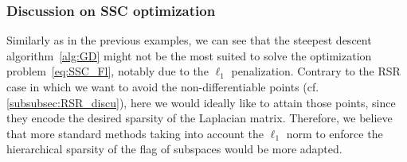 \subsubsection{Discussion on SSC optimization}\label{subsubsec:SSC_discu}
Similarly as in the previous examples, we can see that the steepest descent algorithm~\ref{alg:GD} might not be the most suited to solve the optimization problem~\eqref{eq:SSC_Fl}, notably due to the $\ell_1$ penalization. Contrary to the RSR case in which we want to avoid the non-differentiable points (cf. \autoref{subsubsec:RSR_discu}), here we would ideally like to attain those points, since they encode the desired sparsity of the Laplacian matrix. Therefore, we believe that more standard methods taking into account the $\ell_1$ norm to enforce the hierarchical sparsity of the flag of subspaces would be more adapted.